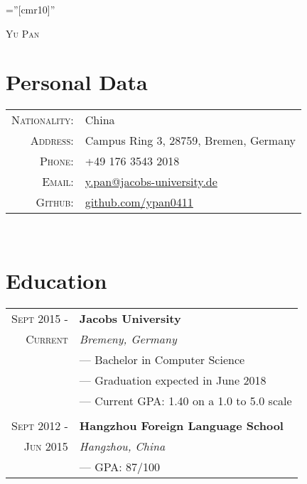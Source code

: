 \documentclass[a4paper,10pt]{article}
\begin{document}
	
	
	\pagestyle{empty} %
	
	\font\fb=''[cmr10]'' %
	
	\par{\centering
		{\huge{\textsc{Yu Pan}}}\bigskip\par}
	
	\section{Personal Data}
	\begin{tabular}{rl}
		\textsc{Nationality:}&China \\
		\textsc{Address:}   & Campus Ring 3, 28759, Bremen, Germany\\
		\textsc{Phone:}     & +49 176 3543 2018\\
		\textsc{Email:}     & \href{mailto:y.pan@jacobs-university.de}{y.pan@jacobs-university.de} \\
		\textsc{Github:} &
		\href{https://github.com/ypan0411}{github.com/ypan0411}
	\end{tabular}
	
	~\\
	
	\section{Education}
	\begin{tabular}{r|l}	
		\textsc{Sept 2015 - } & \textbf{Jacobs University} \\\textsc{Current}&\emph{Bremeny, Germany}
		\\& --- Bachelor in Computer Science
		\\& --- Graduation expected in June 2018
		\\& --- Current GPA: 1.40 on a 1.0 to 5.0 scale
		\\ \multicolumn{2}{c}{} \\
		\textsc{Sept 2012 - } & \textbf{Hangzhou Foreign Language School} \\\textsc{Jun 2015}&\emph{Hangzhou, China}
		\\& --- GPA: 87/100
	\end{tabular}
	
\end{document}
